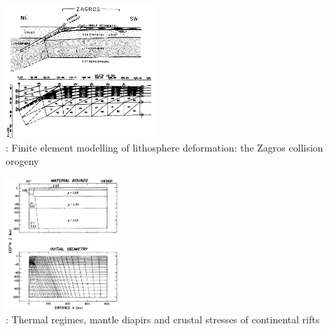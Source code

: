 \begin{center}
\begin{minipage}{0.45\textwidth}
\centering
\includegraphics[height=5cm]{images/history/bird78b}\\
{: Finite element modelling of lithosphere deformation: the Zagros collision 
orogeny \cite{bird78b}}
\end{minipage}\hfill
\begin{minipage}{0.45\textwidth}
\centering
\includegraphics[height=5cm]{images/history/brpo81}\\
{: Thermal regimes, mantle diapirs and crustal stresses of continental rifts \cite{brpo81}}
\end{minipage}
\end{center}


